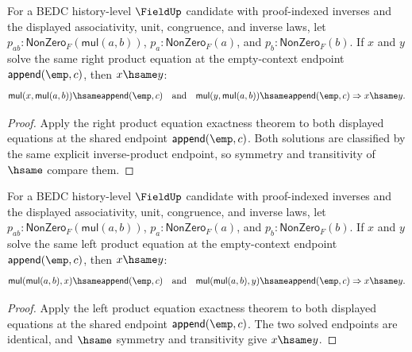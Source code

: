 \begin{theorem}
\label{thm:field-product-right-mul-empty-context-solution-deterministic-from-apartness}
For a BEDC history-level $\FieldUp$ candidate with proof-indexed inverses and
the displayed associativity, unit, congruence, and inverse laws, let
$p_{ab}:\mathsf{NonZero}_F(\mathsf{mul}(a,b))$,
$p_a:\mathsf{NonZero}_F(a)$, and $p_b:\mathsf{NonZero}_F(b)$. If $x$ and $y$
solve the same right product equation at the empty-context endpoint
$\mathsf{append}(\emp,c)$, then $x\hsame y$:
$$
\mathsf{mul}(x,\mathsf{mul}(a,b))\hsame\mathsf{append}(\emp,c)
\quad\text{and}\quad
\mathsf{mul}(y,\mathsf{mul}(a,b))\hsame\mathsf{append}(\emp,c)
\Rightarrow
x\hsame y.
$$
\end{theorem}
\begin{proof}
Apply the right product equation exactness theorem to both displayed
equations at the shared endpoint $\mathsf{append}(\emp,c)$. Both solutions
are classified by the same explicit inverse-product endpoint, so symmetry
and transitivity of $\hsame$ compare them.
\end{proof}

\begin{theorem}
\label{thm:field-product-left-mul-empty-context-solution-deterministic-from-apartness}
For a BEDC history-level $\FieldUp$ candidate with proof-indexed inverses and
the displayed associativity, unit, congruence, and inverse laws, let
$p_{ab}:\mathsf{NonZero}_F(\mathsf{mul}(a,b))$,
$p_a:\mathsf{NonZero}_F(a)$, and $p_b:\mathsf{NonZero}_F(b)$. If $x$ and $y$
solve the same left product equation at the empty-context endpoint
$\mathsf{append}(\emp,c)$, then $x\hsame y$:
$$
\mathsf{mul}(\mathsf{mul}(a,b),x)\hsame\mathsf{append}(\emp,c)
\quad\text{and}\quad
\mathsf{mul}(\mathsf{mul}(a,b),y)\hsame\mathsf{append}(\emp,c)
\Rightarrow
x\hsame y.
$$
\end{theorem}
\begin{proof}
Apply the left product equation exactness theorem to both displayed equations
at the shared endpoint $\mathsf{append}(\emp,c)$. The two solved endpoints
are identical, and $\hsame$ symmetry and transitivity give $x\hsame y$.
\end{proof}

